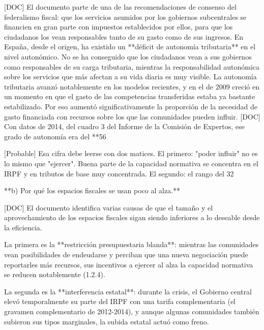 \documentclass[10pt,a4paper]{article}
\begin{document}
[DOC] El documento parte de una de las recomendaciones de consenso del federalismo fiscal: que los servicios asumidos por los gobiernos subcentrales se financien en gran parte con impuestos establecidos por ellos, para que los ciudadanos los vean responsables tanto de su gasto como de sus ingresos. En España, desde el origen, ha existido un **déficit de autonomía tributaria** en el nivel autonómico. No se ha conseguido que los ciudadanos vean a sus gobiernos como responsables de su carga tributaria, mientras la responsabilidad autonómica sobre los servicios que más afectan a su vida diaria es muy visible. La autonomía tributaria avanzó notablemente en los modelos recientes, y en el de 2009 creció en un momento en que el gasto de las competencias transferidas estaba ya bastante estabilizado. Por eso aumentó significativamente la proporción de la necesidad de gasto financiada con recursos sobre los que las comunidades pueden influir. [DOC] Con datos de 2014, del cuadro 3 del Informe de la Comisión de Expertos, ese grado de autonomía era del **56%

[Probable] Esa cifra debe leerse con dos matices. El primero: "poder influir" no es lo mismo que "ejercer". Buena parte de la capacidad normativa se concentra en el IRPF y en tributos de base muy concentrada. El segundo: el rango del 32%

**b) Por qué los espacios fiscales se usan poco al alza.**

[DOC] El documento identifica varias causas de que el tamaño y el aprovechamiento de los espacios fiscales sigan siendo inferiores a lo deseable desde la eficiencia.

La primera es la **restricción presupuestaria blanda**: mientras las comunidades vean posibilidades de endeudarse y perciban que una nueva negociación puede reportarles más recursos, sus incentivos a ejercer al alza la capacidad normativa se reducen notablemente (1.2.4).

La segunda es la **interferencia estatal**: durante la crisis, el Gobierno central elevó temporalmente su parte del IRPF con una tarifa complementaria (el gravamen complementario de 2012-2014), y aunque algunas comunidades también subieron sus tipos marginales, la subida estatal actuó como freno.
\end{document}
